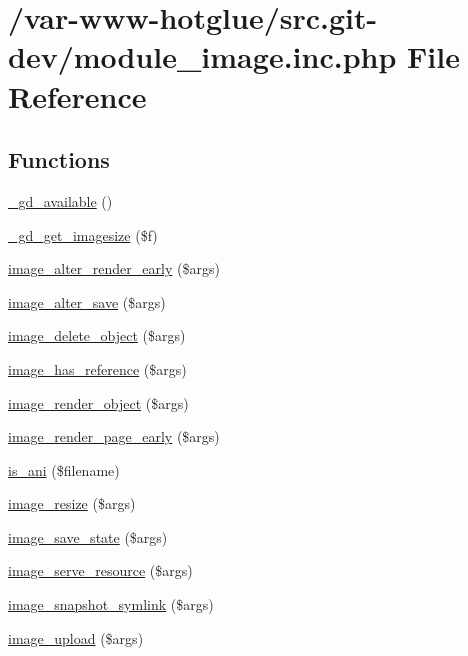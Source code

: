 \hypertarget{module__image_8inc_8php}{
\section{/var-\/www-\/hotglue/src.git-\/dev/module\_\-image.inc.php File Reference}
\label{module__image_8inc_8php}
}
\subsection*{Functions}
\begin{DoxyCompactItemize}
\item 
\hyperlink{module__image_8inc_8php_a574d6d760e50b88ffa815cab30a5e634}{\_\-gd\_\-available} ()
\item 
\hyperlink{module__image_8inc_8php_a3c76028c34273e722c9691243377a208}{\_\-gd\_\-get\_\-imagesize} (\$f)
\item 
\hyperlink{module__image_8inc_8php_ab52d6b71a5c26dbb7e86653652a23251}{image\_\-alter\_\-render\_\-early} (\$args)
\item 
\hyperlink{module__image_8inc_8php_a93578776fb38b10d47bc711cc3469ae9}{image\_\-alter\_\-save} (\$args)
\item 
\hyperlink{module__image_8inc_8php_a7cbcf6138ccff16a8b733cfd6f0f1666}{image\_\-delete\_\-object} (\$args)
\item 
\hyperlink{module__image_8inc_8php_a0bef6164f5eafe368d251639cf6fe298}{image\_\-has\_\-reference} (\$args)
\item 
\hyperlink{module__image_8inc_8php_a4fadded2a225d1b5ea73404a84597620}{image\_\-render\_\-object} (\$args)
\item 
\hyperlink{module__image_8inc_8php_a8266a74a11a86a73e2aa3709388fd43f}{image\_\-render\_\-page\_\-early} (\$args)
\item 
\hyperlink{module__image_8inc_8php_aba67b6eaafc9c80c5b19a9cda9604830}{is\_\-ani} (\$filename)
\item 
\hyperlink{module__image_8inc_8php_a9e03a71310133176236ae0bd4a0241e0}{image\_\-resize} (\$args)
\item 
\hyperlink{module__image_8inc_8php_ac26ea1448f0b7ed835907cf7c22b60ca}{image\_\-save\_\-state} (\$args)
\item 
\hyperlink{module__image_8inc_8php_abb6646bfaa6a012e620cdaaa0bc3c807}{image\_\-serve\_\-resource} (\$args)
\item 
\hyperlink{module__image_8inc_8php_a65d33fafe2da58d0f87f2df1fedbbe62}{image\_\-snapshot\_\-symlink} (\$args)
\item 
\hyperlink{module__image_8inc_8php_a37dee9de60e2852c0631d8e60e58585c}{image\_\-upload} (\$args)
\end{DoxyCompactItemize}


